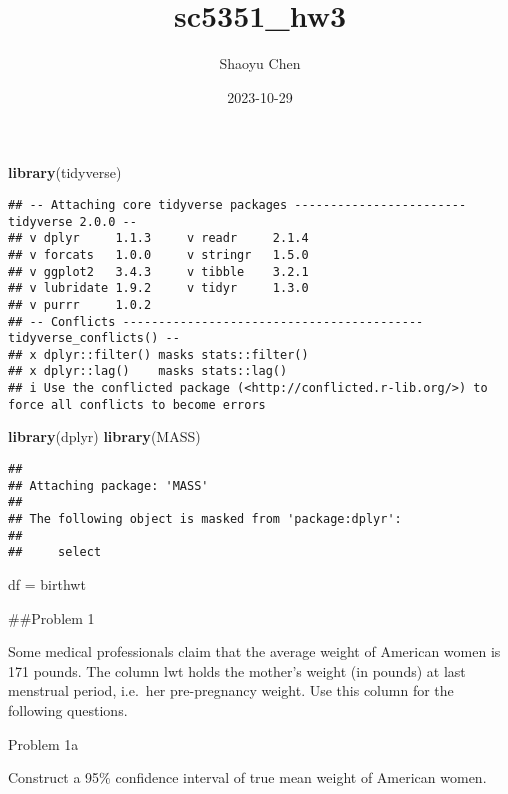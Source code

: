 \documentclass[
]{article}
\title{sc5351\_hw3}
\author{Shaoyu Chen}
\date{2023-10-29}
\newenvironment{Shaded}{\begin{snugshade}}{\end{snugshade}}
\newcommand{\FunctionTok}[1]{\textcolor[rgb]{0.13,0.29,0.53}{\textbf{#1}}}
\newcommand{\NormalTok}[1]{#1}
\newcommand{\OtherTok}[1]{\textcolor[rgb]{0.56,0.35,0.01}{#1}}
\begin{document}
\maketitle

\begin{Shaded}
\begin{Highlighting}[]
\FunctionTok{library}\NormalTok{(tidyverse)}
\end{Highlighting}
\end{Shaded}

\begin{verbatim}
## -- Attaching core tidyverse packages ------------------------ tidyverse 2.0.0 --
## v dplyr     1.1.3     v readr     2.1.4
## v forcats   1.0.0     v stringr   1.5.0
## v ggplot2   3.4.3     v tibble    3.2.1
## v lubridate 1.9.2     v tidyr     1.3.0
## v purrr     1.0.2     
## -- Conflicts ------------------------------------------ tidyverse_conflicts() --
## x dplyr::filter() masks stats::filter()
## x dplyr::lag()    masks stats::lag()
## i Use the conflicted package (<http://conflicted.r-lib.org/>) to force all conflicts to become errors
\end{verbatim}

\begin{Shaded}
\begin{Highlighting}[]
\FunctionTok{library}\NormalTok{(dplyr)}
\FunctionTok{library}\NormalTok{(MASS)}
\end{Highlighting}
\end{Shaded}

\begin{verbatim}
## 
## Attaching package: 'MASS'
## 
## The following object is masked from 'package:dplyr':
## 
##     select
\end{verbatim}

\begin{Shaded}
\begin{Highlighting}[]
\NormalTok{df }\OtherTok{=}\NormalTok{ birthwt}
\end{Highlighting}
\end{Shaded}

\#\#Problem 1

Some medical professionals claim that the average weight of American
women is 171 pounds. The column lwt holds the mother's weight (in
pounds) at last menstrual period, i.e.~her pre-pregnancy weight. Use
this column for the following questions.

Problem 1a

Construct a 95\% confidence interval of true mean weight of American
women.
\end{document}
